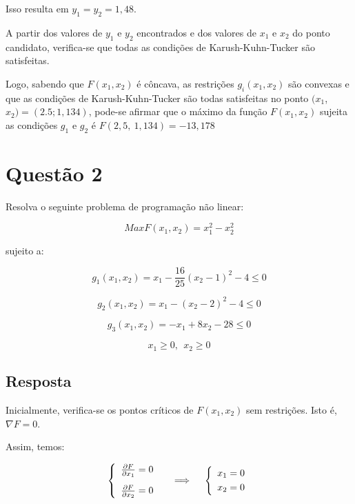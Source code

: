 \documentclass{article}
\begin{document}
        Isso resulta em $y_{1} =  y_{2} = 1,48$. 
        
        A partir dos valores de  $y_{1}$ e $y_{2}$ encontrados e dos valores de $x_{1}$ e $x_{2}$ do ponto candidato, verifica-se que todas as condições de Karush-Kuhn-Tucker são satisfeitas.
        
        Logo, sabendo que $F(x_{1}, x_{2})$ é côncava, as restrições $g_{i}(x_{1}, x_{2})$ são convexas e que as condições de  Karush-Kuhn-Tucker são todas satisfeitas no ponto $(x_{1}$, $x_{2}) = (2.5; 1,134 )$, pode-se afirmar que o máximo da função $F(x_{1}, x_{2})$ sujeita as condições $g_{1}$ e $g_{2}$ é $F(2,5 , \: 1,134) = -13, 178$
        

        
   
\newpage
\section{Questão 2}
    
    Resolva o seguinte problema de programação não linear:

    
    $$ Max F(x_{1}, x_{2}) =  x_{1} ^2 - x_{2}^2 $$
    
    sujeito a: 
    
    $$ g_{1}(x_{1}, x_{2}) =    x_{1}  - \frac{16}{25} \left( x_{2}  - 1 \right)^2 -4 \leq 0 $$
    
    $$ g_{2}(x_{1}, x_{2}) =    x_{1}  -  \left( x_{2}  - 2 \right)^2 -4 \leq 0 $$
    
    $$ g_{3}(x_{1}, x_{2}) =   - x_{1}  + 8x_{2}  -28 \leq 0 $$
    
    $$ x_{1} \geq 0 , \: \: x_{2} \geq 0  $$
    
\subsection{Resposta}

     Inicialmente, verifica-se os pontos críticos de $F(x_{1}, x_{2})$  sem restrições. Isto é, $\nabla F = 0$. 
        
        Assim, temos: 
        
        $$ \left\{
                \begin{array}{ll}
                  \frac{\partial F}{\partial x_{1}} = 0 \vspace{0.3cm} \\
                  
                  \frac{\partial F}{\partial x_{2}} = 0
                \end{array}
              \right.
            \quad  \implies \quad 
            \left\{
                \begin{array}{ll}
                  x_{1} = 0 \vspace{0.1cm} \\
                  
                  x_{2} = 0
                \end{array}
              \right.
         $$
         
\end{document}
